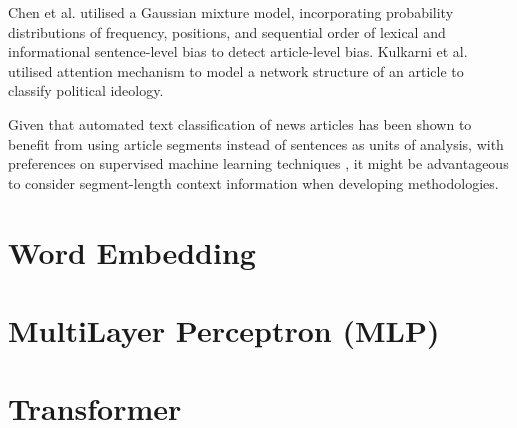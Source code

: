 Chen et al. \cite{chen-2020-detecting-media-bias-gaussian} utilised a Gaussian mixture model, incorporating probability distributions of frequency, positions, and sequential order of lexical and informational sentence-level bias to detect article-level bias. Kulkarni et al. \cite{kulkarni-2018-multi-view} utilised attention mechanism to model a network structure of an article to classify political ideology.

Given that automated text classification of news articles has been shown to benefit from using article segments instead of sentences as units of analysis, with preferences on supervised machine learning techniques \cite{barbera-2021-article-classification}, it might be advantageous to consider segment-length context information when developing methodologies.

\section{Word Embedding}

\section{MultiLayer Perceptron (MLP)}

\section{Transformer}

